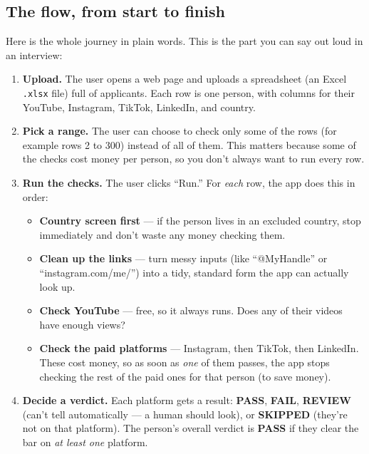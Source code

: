 \documentclass[11pt]{article}
\newcommand{\term}[1]{\textbf{\color{brandpurple}#1}}
\newcommand{\file}[1]{\texttt{\color{inkdark}#1}}
\begin{document}
\subsection{The flow, from start to finish}

Here is the whole journey in plain words. This is the part you can say out loud
in an interview:

\begin{enumerate}[leftmargin=1.6em, itemsep=5pt]
  \item \textbf{Upload.} The user opens a web page and uploads a spreadsheet
  (an Excel \file{.xlsx} file) full of applicants. Each row is one person, with
  columns for their YouTube, Instagram, TikTok, LinkedIn, and country.

  \item \textbf{Pick a range.} The user can choose to check only some of the
  rows (for example rows 2 to 300) instead of all of them. This matters because
  some of the checks cost money per person, so you don't always want to run
  every row.

  \item \textbf{Run the checks.} The user clicks ``Run.'' For \emph{each} row,
  the app does this in order:
  \begin{itemize}
    \item \textbf{Country screen first} — if the person lives in an excluded
    country, stop immediately and don't waste any money checking them.
    \item \textbf{Clean up the links} — turn messy inputs (like
    ``@MyHandle'' or ``instagram.com/me/'') into a tidy, standard form the
    app can actually look up.
    \item \textbf{Check YouTube} — free, so it always runs. Does any of their
    videos have enough views?
    \item \textbf{Check the paid platforms} — Instagram, then TikTok, then
    LinkedIn. These cost money, so as soon as \emph{one} of them passes, the
    app stops checking the rest of the paid ones for that person (to save
    money).
  \end{itemize}

  \item \textbf{Decide a verdict.} Each platform gets a result: \term{PASS},
  \term{FAIL}, \term{REVIEW} (can't tell automatically — a human should look),
  or \term{SKIPPED} (they're not on that platform). The person's overall
  verdict is \term{PASS} if they clear the bar on \emph{at least one} platform.


\end{enumerate}
\end{document}
